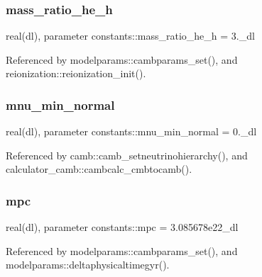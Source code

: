 \mbox{\label{namespaceconstants_af8b29ede25f97b7cd054d486d8bf649c}} 
\subsubsection{\texorpdfstring{mass\+\_\+ratio\+\_\+he\+\_\+h}{mass\_ratio\_he\_h}}
{\footnotesize\ttfamily real(dl), parameter constants\+::mass\+\_\+ratio\+\_\+he\+\_\+h = 3.\+\_\+dl}



Referenced by modelparams\+::cambparams\+\_\+set(), and reionization\+::reionization\+\_\+init().

\mbox{\label{namespaceconstants_a426cbb833c6e3c6df1a25d5a7eeeaeda}} 
\subsubsection{\texorpdfstring{mnu\+\_\+min\+\_\+normal}{mnu\_min\_normal}}
{\footnotesize\ttfamily real(dl), parameter constants\+::mnu\+\_\+min\+\_\+normal = 0.\+\_\+dl}



Referenced by camb\+::camb\+\_\+setneutrinohierarchy(), and calculator\+\_\+camb\+::cambcalc\+\_\+cmbtocamb().

\mbox{\label{namespaceconstants_a8375c8f64af8b53668cecd9e5c58fea2}} 
\subsubsection{\texorpdfstring{mpc}{mpc}}
{\footnotesize\ttfamily real(dl), parameter constants\+::mpc = 3.\+085678e22\+\_\+dl}



Referenced by modelparams\+::cambparams\+\_\+set(), and modelparams\+::deltaphysicaltimegyr().

\mbox{\label{namespaceconstants_ab60f94607e30c3b961f91dce9248e2bd}} 

